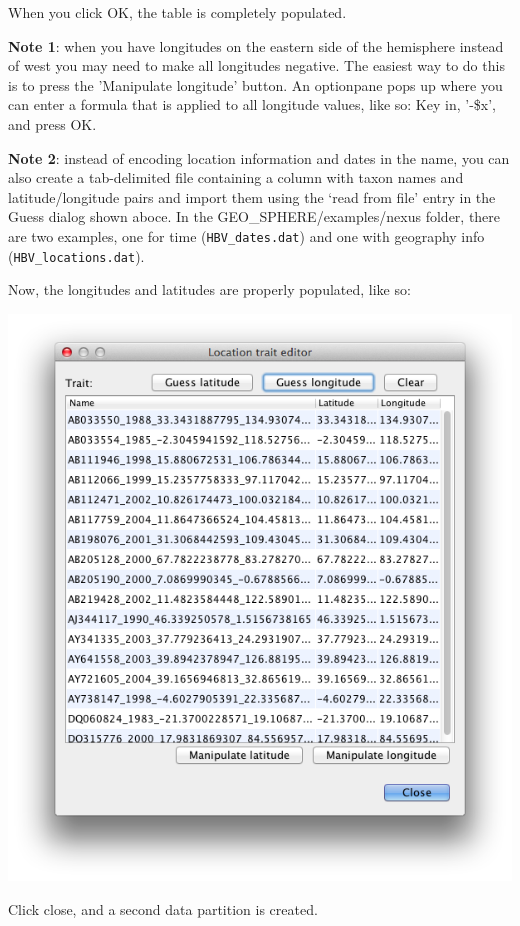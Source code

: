 \documentclass{article}
\def\beast-geo{GEO\_SPHERE}
\begin{document}
When you click OK, the table is completely populated. 

{\bf Note  1}: when you have longitudes on the eastern side of the hemisphere  instead of west you may need to make all longitudes negative. The easiest way to do this is to press the 'Manipulate longitude' button. An optionpane pops up where you can enter a formula that is applied to all longitude values, like so:
Key in, '-\$x', and press OK. 

{\bf Note  2}: instead of encoding location information and dates in the name, you can also create a tab-delimited file containing a column with taxon names and latitude/longitude pairs and import them using the  `read from file' entry in the Guess dialog shown aboce. In the \beast-geo/examples/nexus folder, there are two examples, one for time ({\tt HBV\_dates.dat}) and one with geography info ({\tt HBV\_locations.dat}).

Now, the longitudes and latitudes are properly populated, like so:

\includegraphics[scale=0.4]{figures/BEAUti_geography6.png}

Click close, and a second data partition is created.
\end{document}
